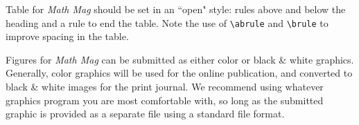 \documentclass{article}
\theoremstyle{theorem}
\theoremstyle{definition}
\begin{document}
    Table for  \textit{Math Mag} should be set in an ``open" style: rules above and below the heading and a rule to end the table.  Note the use of \verb~\abrule~ and \verb~\brule~ to improve spacing in the table.



    Figures for  \textit{Math Mag} can be submitted as either color or black \& white graphics.  Generally, color graphics will be used for the online publication, and converted to black \& white images for the print journal.  We recommend using whatever graphics program you are most comfortable with, so long as the submitted graphic is provided as a separate file using a standard file format.
\end{document}
